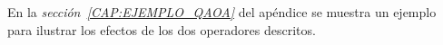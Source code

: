 En la \textit{sección~\ref{CAP:EJEMPLO_QAOA}} del apéndice se muestra un ejemplo para ilustrar los efectos de los dos operadores descritos.



